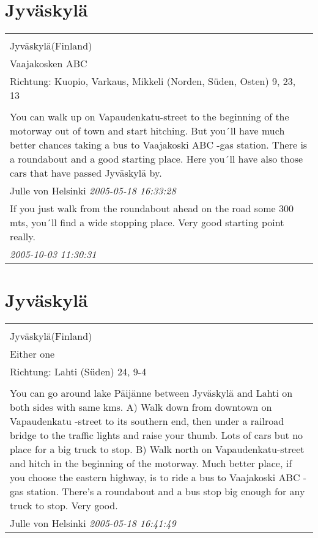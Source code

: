 \documentclass[a4paper,12pt]{article}
\begin{document}
\section{Jyväskylä}
\begin{tabular}{|p{13cm}|}
\hline\\
Jyväskylä(Finland)\\
Vaajakosken ABC\\
Richtung: Kuopio, Varkaus, Mikkeli (Norden, Süden, Osten) 9, 23, 13 \\
\hline\\
You can walk up on Vapaudenkatu-street to the beginning of the motorway out of town and start hitching.
But you´ll have much better chances taking a bus to Vaajakoski ABC -gas station. There is a roundabout and a good starting place. Here you´ll have also those cars that have passed Jyväskylä by. \\
Julle von Helsinki \textit{ 2005-05-18 16:33:28 }\\\hline If you just walk from the roundabout ahead on the road some 300 mts, you´ll find a wide stopping place. Very good starting point really. \\
\textit{ 2005-10-03 11:30:31 }\\\hline
\end{tabular}


\section{Jyväskylä}
\begin{tabular}{|p{13cm}|}
\hline\\
Jyväskylä(Finland)\\
Either one\\
Richtung: Lahti (Süden) 24, 9-4 \\
\hline\\
You can go around lake Päijänne between Jyväskylä and Lahti on both sides with same kms.
A) Walk down from downtown on Vapaudenkatu -street to its southern end, then under a railroad bridge to the traffic lights and raise your thumb. Lots of cars but no place for a big truck to stop.
B) Walk north on Vapaudenkatu-street and hitch in the beginning of the motorway. Much better place, if you choose the eastern highway, is to ride a bus to Vaajakoski ABC -gas station. There's a roundabout and a bus stop big enough for any truck to stop. Very good. \\
Julle von Helsinki \textit{ 2005-05-18 16:41:49 }\\\hline
\end{tabular}
\end{document}
